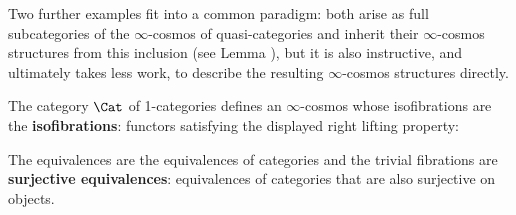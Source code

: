 Two further examples fit into a common paradigm: both arise as full subcategories of the $\infty$-cosmos of quasi-categories and inherit their $\infty$-cosmos structures from this inclusion (see Lemma \cite[6.1.4]{RiehlVerity:2022eo}), but it is also instructive, and ultimately takes less work, to describe the resulting $\infty$-cosmos structures directly.

\begin{proposition}\label{prop:cat-cosmos}
 The category $\Cat$ of 1-cat\-e\-go\-ri\-es defines an $\infty$-cosmos whose isofibrations are the \textbf{isofibrations}: functors satisfying the displayed right lifting property:
\begin{center}
\end{center}
The equivalences are the equivalences of categories and the trivial fibrations are \textbf{surjective equivalences}: equivalences of categories that are also surjective on objects.
\end{proposition}
